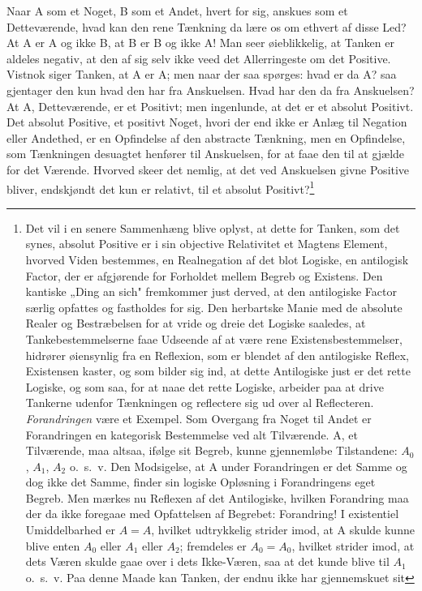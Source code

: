 \documentclass[12pt]{book}
\begin{document}
Naar A som et Noget, B som et Andet, hvert for sig, anskues som et Detteværende, hvad
kan den rene Tænkning da lære os om ethvert af disse Led? At A er A og ikke B, at B er
B og ikke A! Man seer øieblikkelig, at Tanken er aldeles negativ, at den af sig selv
ikke veed det Allerringeste om det Positive. Vistnok siger Tanken, at A er A; men naar
der saa spørges: hvad er da A? saa gjentager den kun hvad den har fra Anskuelsen. Hvad
har den da fra Anskuelsen? At A, Detteværende, er et Positivt; men ingenlunde, at det
er et absolut Positivt. Det absolut Positive, et positivt Noget, hvori der end ikke er
Anlæg til Negation eller Andethed, er en Opfindelse af den abstracte Tænkning, men en
Opfindelse, som Tænkningen desuagtet henfører til Anskuelsen, for at faae den til at
gjælde for det Værende. Hvorved skeer det nemlig, at det ved Anskuelsen givne Positive
bliver, endskjøndt det kun er relativt, til et absolut Positivt?\footnote{Det vil i en
senere Sammenhæng blive oplyst, at dette for Tanken, som det synes, absolut Positive
er i sin objective Relativitet et Magtens Element, hvorved Viden bestemmes, en
Realnegation af det blot Logiske, en antilogisk Factor, der er afgjørende for
Forholdet mellem Begreb og Existens. Den kantiske „Ding an sich" fremkommer just
derved, at den antilogiske Factor særlig opfattes og fastholdes for sig. Den
herbartske Manie med de absolute Realer og Bestræbelsen for at vride og dreie det
Logiske saaledes, at Tankebestemmelserne faae Udseende af at være rene
Existensbestemmelser, hidrører øiensynlig fra en Reflexion, som er blendet af den
antilogiske Reflex, Existensen kaster, og som bilder sig ind, at dette Antilogiske
just er det rette Logiske, og som saa, for at naae det rette Logiske, arbeider paa at
drive Tankerne udenfor Tænkningen og reflectere sig ud over al Reflecteren.
\emph{Forandringen} være et Exempel. Som Overgang fra Noget til Andet er Forandringen
en kategorisk Bestemmelse ved alt Tilværende. A, et Tilværende, maa altsaa, ifølge sit
Begreb, kunne gjennemløbe Tilstandene: $A_0$, $A_1$, $A_2$ o.\ s.\ v. Den Modsigelse, at
A under Forandringen er det Samme og dog ikke det Samme, finder sin logiske Opløsning
i Forandringens eget Begreb. Men mærkes nu Reflexen af det Antilogiske, hvilken
Forandring maa der da ikke foregaae med Opfattelsen af Begrebet: Forandring! I
existentiel Umiddelbarhed er $A = A$, hvilket udtrykkelig strider imod, at A skulde
kunne blive enten $A_0$ eller $A_1$ eller $A_2$; fremdeles er $A_0 = A_0$, hvilket strider
imod, at dets Væren skulde gaae over i dets Ikke-Væren, saa at det kunde blive til
$A_1$ o.\ s.\ v. Paa denne Maade kan Tanken, der endnu ikke har gjennemskuet sit
}
\end{document}
